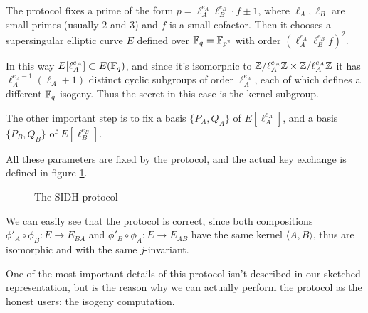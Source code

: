 The protocol fixes a prime of the form $p=\ell_A^{e_A}\ell_B^{e_B}\cdot f\pm1$, where $\ell_A,\ell_B$ are small primes (usually $2$ and $3$) and $f$ is a small cofactor. Then it chooses a supersingular elliptic curve $E$ defined over $\mathbb{F}_q=\mathbb{F}_{p^2}$ with order $(\ell_A^{e_A}\ell_B^{e_B} f)^2$.

In this way $E[\ell_A^{e_A}]\subset E(\mathbb{F}_q)$, and since it's isomorphic to $\mathbb{Z}/\ell_A^{e_A}\mathbb{Z}\times\mathbb{Z}/\ell_A^{e_A}\mathbb{Z}$ it has $\ell_A^{e_A-1}(\ell_A+1)$ distinct cyclic subgroups of order $\ell_A^{e_A}$, each of which defines a different $\mathbb{F}_q$-isogeny. Thus the secret in this case is the kernel subgroup.

The other important step is to fix a basis $\{ P_A,Q_A \}$ of $E[\ell_A^{e_A}]$, and a basis $\{ P_B, Q_B \}$ of $E[\ell_B^{e_B}]$.

All these parameters are fixed by the protocol, and the actual key exchange is defined in figure \ref{prot_SIDH}.

\begin{figure}
    \caption{The SIDH protocol}
    \label{prot_SIDH}
\end{figure}

We can easily see that the protocol is correct, since both compositions $\phi'_A\circ\phi_B:E\to E_{BA}$ and $\phi'_B\circ\phi_A:E\to E_{AB}$ have the same kernel $\langle A,B\rangle$, thus are isomorphic and with the same $j$-invariant.

One of the most important details of this protocol isn't described in our sketched representation, but is the reason why we can actually perform the protocol as the honest users: the isogeny computation.

